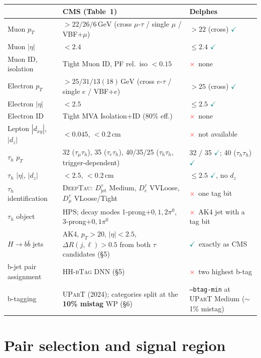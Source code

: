 \documentclass[11pt,a4paper]{article}
\newcommand{\tauh}{\tau_{h}}
\newcommand{\ok}{\textcolor{teal}{$\checkmark$}}
\newcommand{\no}{\textcolor{red}{$\times$}}
\newcommand{\pt}{p_{T}}
\begin{document}
\begin{table}[htbp]
\centering\small
\begin{tabular}{@{}lp{5.6cm}p{5.4cm}@{}}
\toprule
& \textbf{CMS (Table~1)} & \textbf{Delphes} \\
\midrule
Muon $\pt$ & $>22/26/6\,\si{\GeV}$ (cross $\mu$-$\tau$ / single $\mu$ / VBF+$\mu$)
           & $>22$ (cross) \ok \\
Muon $|\eta|$ & $<2.4$ & $\le 2.4$ \ok \\
Muon ID, isolation & Tight Muon ID, PF rel.\ iso $<0.15$ & \no\ none \\
\midrule
Electron $\pt$ & $>25/31/13(18)\,\si{\GeV}$ (cross $e$-$\tau$ / single $e$ / VBF+$e$)
               & $>25$ (cross) \ok \\
Electron $|\eta|$ & $<2.5$ & $\le 2.5$ \ok \\
Electron ID & Tight MVA Isolation+ID (80\% eff.) & \no\ none \\
\midrule
Lepton $|d_{xy}|$, $|d_z|$ & $<0.045$, $<0.2\,\si{\cm}$ & \no\ not available \\
\midrule
$\tauh$ $\pt$ & 32 ($\tau_\mu\tauh$), 35 ($\tau_e\tauh$),
                40/35/25 ($\tauh\tauh$, trigger-dependent)
              & 32 / 35 \ok; 40 ($\tauh\tauh$) \ok \\
$\tauh$ $|\eta|$, $|d_z|$ & $<2.5$, $<0.2\,\si{\cm}$ & $\le 2.5$ \ok, no $d_z$ \\
$\tauh$ identification & \textsc{DeepTau}: $D^\tau_{\mathrm{jet}}$ Medium,
                         $D^\tau_e$ VVLoose, $D^\tau_\mu$ VLoose/Tight
                       & \no\ one tag bit \\
$\tauh$ object & HPS; decay modes 1-prong$+0,1,2\pi^0$, 3-prong$+0,1\pi^0$
               & \no\ AK4 jet with a tag bit \\
\midrule
$H\rightarrow b\bar b$ jets & AK4, $\pt>20$, $|\eta|<2.5$,
                              $\Delta R(j,\ell)>0.5$ from both $\tau$ candidates (\S5)
                            & \ok\ exactly as CMS \\
b-jet pair assignment & HH-\textsc{bTag} DNN (\S5) & \no\ two highest b-tag \\
b-tagging & \textsc{UParT} (2024); categories split at the \textbf{10\% mistag} WP (\S6)
          & \texttt{--btag-min} at \textsc{UParT} Medium ($\sim$1\% mistag) \\
\bottomrule
\end{tabular}
\end{table}

\section{Pair selection and signal region}
\end{document}
